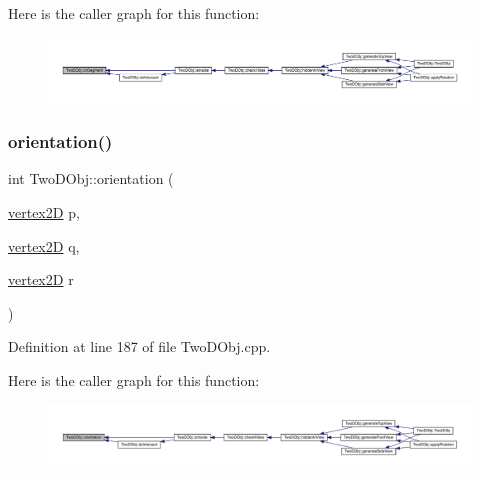 Here is the caller graph for this function\+:
\nopagebreak
\begin{figure}[H]
\begin{center}
\leavevmode
\includegraphics[width=350pt]{class_two_d_obj_a17f849373d477c1d46dfc917fe70c75b_icgraph}
\end{center}
\end{figure}
\mbox{\label{class_two_d_obj_a68ccca268283f878cfa12c73365471a3}} 
\subsubsection{\texorpdfstring{orientation()}{orientation()}}
{\footnotesize\ttfamily int Two\+D\+Obj\+::orientation (\begin{DoxyParamCaption}\item[{\mbox{\hyperlink{structvertex2_d}{vertex2D}}}]{p,  }\item[{\mbox{\hyperlink{structvertex2_d}{vertex2D}}}]{q,  }\item[{\mbox{\hyperlink{structvertex2_d}{vertex2D}}}]{r }\end{DoxyParamCaption})}



Definition at line 187 of file Two\+D\+Obj.\+cpp.

Here is the caller graph for this function\+:
\nopagebreak
\begin{figure}[H]
\begin{center}
\leavevmode
\includegraphics[width=350pt]{class_two_d_obj_a68ccca268283f878cfa12c73365471a3_icgraph}
\end{center}
\end{figure}
\mbox{\label{class_two_d_obj_ab9d3420793d260703d8882196efccfc9}} 
